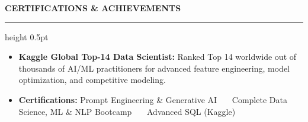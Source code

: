 \documentclass[10pt,letterpaper]{article}
\newcommand{\resumesection}[1]{%
  \vspace{3.0pt}%
  {\fontsize{10pt}{11.5pt}\selectfont\textbf{\MakeUppercase{#1}}}%
  \vspace{1.0pt}%
  \hrule height 0.5pt%
  \vspace{2.0pt}%
}
\begin{document}
\resumesection{Certifications \& Achievements}
\begin{itemize}
  \item \textbf{Kaggle Global Top-14 Data Scientist:} Ranked Top 14 worldwide out of thousands of AI/ML practitioners for advanced feature engineering, model optimization, and competitive modeling.
  \item \textbf{Certifications:} Prompt Engineering \& Generative AI \ \textbar\ \ Complete Data Science, ML \& NLP Bootcamp \ \textbar\ \ Advanced SQL (Kaggle)
\end{itemize}
\end{document}
